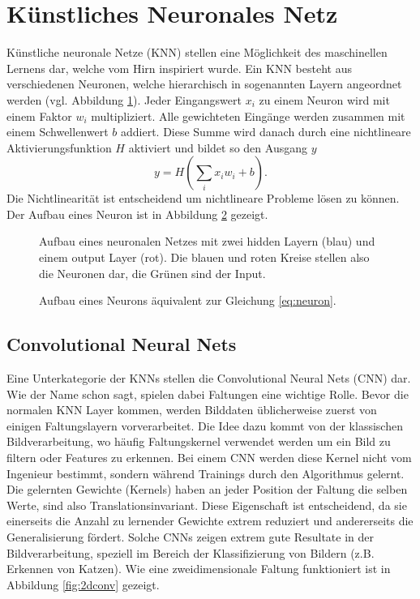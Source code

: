 \section{Künstliches Neuronales Netz}

Künstliche neuronale Netze (KNN) stellen eine Möglichkeit des maschinellen Lernens dar, welche vom Hirn inspiriert wurde.
Ein KNN besteht aus verschiedenen Neuronen, welche hierarchisch in sogenannten Layern angeordnet werden (vgl. Abbildung \ref{fig:neuralnet}).
Jeder Eingangswert $x_i$ zu einem Neuron wird mit einem Faktor $w_i$ multipliziert.
Alle gewichteten Eingänge werden zusammen mit einem Schwellenwert $b$ addiert.
Diese Summe wird danach durch eine nichtlineare Aktivierungsfunktion $H$ aktiviert und bildet so den Ausgang $y$
\begin{equation} \label{eq:neuron}
y=H\left(\sum_{i} x_i w_i+b\right).
\end{equation}
Die Nichtlinearität ist entscheidend um nichtlineare Probleme lösen zu können.
Der Aufbau eines Neuron ist in Abbildung \ref{fig:neuron} gezeigt. 

\begin{figure}
	\centering
	
	\caption{Aufbau eines neuronalen Netzes mit zwei hidden Layern (blau) und einem output Layer (rot). Die blauen und roten Kreise stellen also die Neuronen dar, die Grünen sind der Input.}
	\label{fig:neuralnet}
\end{figure}

\begin{figure}
	\centering
	
	\caption{Aufbau eines Neurons äquivalent zur Gleichung \ref{eq:neuron}.}
	\label{fig:neuron}
\end{figure}

\subsection{Convolutional Neural Nets}

Eine Unterkategorie der KNNs stellen die Convolutional Neural Nets (CNN) dar.
Wie der Name schon sagt, spielen dabei Faltungen eine wichtige Rolle.
Bevor die normalen KNN Layer kommen, werden Bilddaten üblicherweise zuerst von einigen Faltungslayern vorverarbeitet.
Die Idee dazu kommt von der klassischen Bildverarbeitung, wo häufig Faltungskernel verwendet werden um ein Bild zu filtern oder Features zu erkennen.
Bei einem CNN werden diese Kernel nicht vom Ingenieur bestimmt, sondern während Trainings durch den Algorithmus gelernt.  
Die gelernten Gewichte (Kernels) haben an jeder Position der Faltung die selben Werte, sind also Translationsinvariant.
Diese Eigenschaft ist entscheidend, da sie einerseits die Anzahl zu lernender Gewichte extrem reduziert und andererseits die Generalisierung fördert.
Solche CNNs zeigen extrem gute Resultate in der Bildverarbeitung, speziell im Bereich der Klassifizierung von Bildern (z.B. Erkennen von Katzen).
Wie eine zweidimensionale Faltung funktioniert ist in Abbildung \ref{fig:2dconv} gezeigt.

